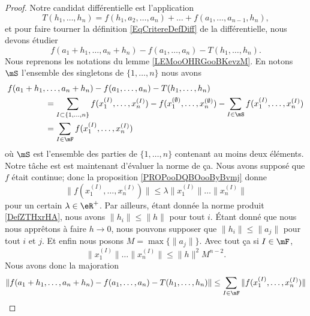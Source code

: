 \begin{proof}
	Notre candidat différentielle est l'application
	\begin{equation}
		T(h_1,\ldots,h_n)=f(h_1,a_2,\ldots,a_n)+\ldots+f(a_1,\ldots,a_{n-1},h_n),
	\end{equation}
	et pour faire tourner la définition \eqref{EqCritereDefDiff} de la différentielle, nous devons étudier
	\begin{equation}
		f(a_1+h_1,\ldots,a_n+h_n)-f(a_1,\ldots,a_n)-T(h_1,\ldots,h_n).
	\end{equation}
	Nous reprenons les notations du lemme \ref{LEMooOHRGooBKevzM}. En notons \( \mS\) l'ensemble des singletons de \( \{ 1,\ldots,n \}\) nous avons
	\begin{subequations}
		\begin{align}
			f(a_1+h_1, & \ldots,a_n+h_n)  -f(a_1,\ldots,a_n)-T(h_1,\ldots,h_n)                                                                                                       \\
			           & =\sum_{I\subset\{ 1,\ldots,n \}}f(x_1^{(I)},\ldots,x_n^{(I)})  -f(x_1^{(\emptyset)},\ldots,x_n^{(\emptyset)}) - \sum_{I\in\mS}f(x_1^{(I)},\ldots,x_n^{(I)}) \\
			           & =\sum_{I\in\mF}f(x_1^{(I)},\ldots,x_n^{(I)})
		\end{align}
	\end{subequations}
	où \( \mS\) est l'ensemble des parties de \( \{ 1,\ldots,n \}\) contenant au moins deux éléments. Notre tâche est est maintenant d'évaluer la norme de ça. Nous avons supposé que \( f\) était continue; donc la proposition \ref{PROPooDQBOooByBvmj} donne
	\begin{equation}
		\| f(x_1^{(I)},\ldots,x_n^{(I)}) \|\leq \lambda\| x_1^{(I)} \|\ldots\| x_n^{(I)} \|
	\end{equation}
	pour un certain \( \lambda\in \eR^+\). Par ailleurs, étant donnée la norme produit \ref{DefZTHxrHA}, nous avons \( \| h_i \|\leq \| h \|\) pour tout \( i\). Étant donné que nous nous apprêtons à faire \( h\to 0\), nous pouvons supposer que \( \| h_i \|\leq \| a_j \|\) pour tout \( i\) et \( j\). Et enfin nous posons \( M=\max\{ \| a_j \| \}\). Avec tout ça si \( I\in\mF\),
	\begin{equation}
		\| x_1^{(I)} \|\ldots\| x_n^{(I)} \|\leq \| h \|^2M^{n-2}.
	\end{equation}
	Nous avons donc la majoration
	\begin{subequations}
		\begin{align}
			\| f(a_1+h_1,\ldots,a_n+h_n)-f(a_1,\ldots,a_n)-T(h_1,\ldots,h_n) \| & \leq \sum_{I\in\mF}\| f(x_1^{(I)},\ldots,x_n^{(I)}) \| \\

\end{align}
\end{subequations}
\end{proof}
